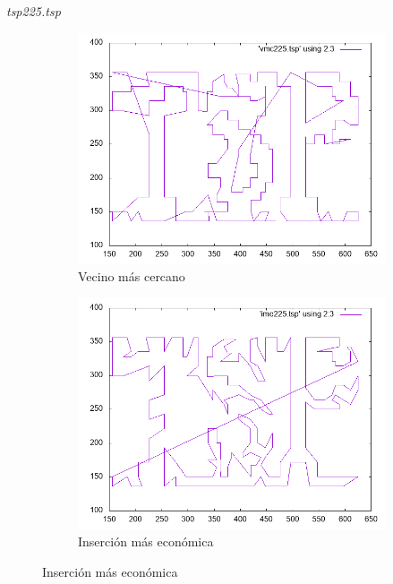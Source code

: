 \documentclass{beamer}
\begin{document}
\begin{frame}[fragile]{\textit{tsp225.tsp}}
\begin{figure}[H]
\centering
\begin{subfigure}[b]{0.36\textwidth}
\includegraphics[width=\textwidth]{tsp225_vmc.png}
\caption*{\small{Vecino más cercano}}
\end{subfigure}
\quad
\begin{subfigure}[b]{0.36\textwidth}
\includegraphics[width=\textwidth]{tsp225_ime.png}
\caption*{\small{Inserción más económica}}
\end{subfigure}

\vspace{0.25cm}


\end{figure}
\end{frame}
\end{document}
